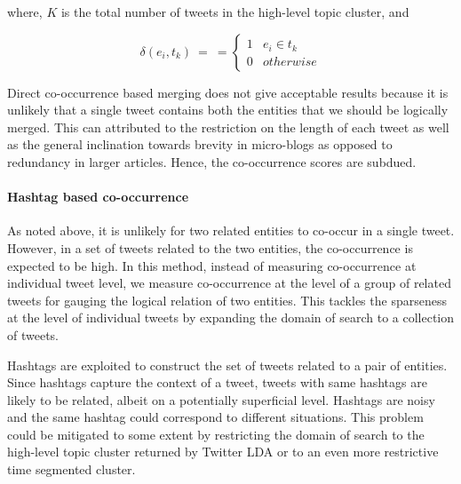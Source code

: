 where, $K$ is the total number of tweets in the high-level topic cluster, and 


$$
\delta(e_i, t_k)~=~ = \left\{
        \begin{array}{ll}
            1 & e_i \in t_k \\
            0 & otherwise 
        \end{array}
    \right.
$$

Direct co-occurrence based merging does not give acceptable results because it is unlikely that a single tweet contains both the entities that we should be logically merged. This can attributed to the restriction on the length of each tweet as well as the general inclination towards brevity in micro-blogs as opposed to redundancy in larger articles. Hence, the co-occurrence scores are subdued.

\paragraph{Hashtag based co-occurrence}
As noted above, it is unlikely for two related entities to co-occur in a single tweet. However, in a set of tweets related to the two entities, the co-occurrence is expected to be high. In this method, instead of measuring co-occurrence at individual tweet level, we measure co-occurrence at the level of a group of related tweets for gauging the logical relation of two entities. This tackles the sparseness at the level of individual tweets by expanding the domain of search to a collection of tweets. 

Hashtags are exploited to construct the set of tweets related to a pair of entities. Since hashtags capture the context of a tweet, tweets with same hashtags are likely to be related, albeit on a potentially superficial level. Hashtags are noisy and the same hashtag could correspond to different situations. This problem could be mitigated to some extent by restricting the domain of search to the high-level topic cluster returned by Twitter LDA or to an even more restrictive time segmented cluster.

